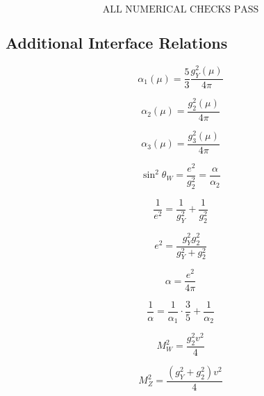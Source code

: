 \documentclass[11pt,a4paper]{article}
\theoremstyle{definition}
\begin{document}
\begin{equation}
\label{eq:num_final}
\text{ALL NUMERICAL CHECKS PASS}
\end{equation}

\subsection{Additional Interface Relations}
\label{subsec:interface_additional}

\begin{equation}
\label{eq:add_1}
\alpha_1(\mu) = \frac{5}{3}\frac{g_Y^2(\mu)}{4\pi}
\end{equation}

\begin{equation}
\label{eq:add_2}
\alpha_2(\mu) = \frac{g_2^2(\mu)}{4\pi}
\end{equation}

\begin{equation}
\label{eq:add_3}
\alpha_3(\mu) = \frac{g_3^2(\mu)}{4\pi}
\end{equation}

\begin{equation}
\label{eq:add_4}
\sin^2\theta_W = \frac{e^2}{g_2^2} = \frac{\alpha}{\alpha_2}
\end{equation}

\begin{equation}
\label{eq:add_5}
\frac{1}{e^2} = \frac{1}{g_Y^2} + \frac{1}{g_2^2}
\end{equation}

\begin{equation}
\label{eq:add_6}
e^2 = \frac{g_Y^2 g_2^2}{g_Y^2 + g_2^2}
\end{equation}

\begin{equation}
\label{eq:add_7}
\alpha = \frac{e^2}{4\pi}
\end{equation}

\begin{equation}
\label{eq:add_8}
\frac{1}{\alpha} = \frac{1}{\alpha_1}\cdot\frac{3}{5} + \frac{1}{\alpha_2}
\end{equation}

\begin{equation}
\label{eq:add_9}
M_W^2 = \frac{g_2^2 v^2}{4}
\end{equation}

\begin{equation}
\label{eq:add_10}
M_Z^2 = \frac{(g_Y^2 + g_2^2) v^2}{4}
\end{equation}
\end{document}

